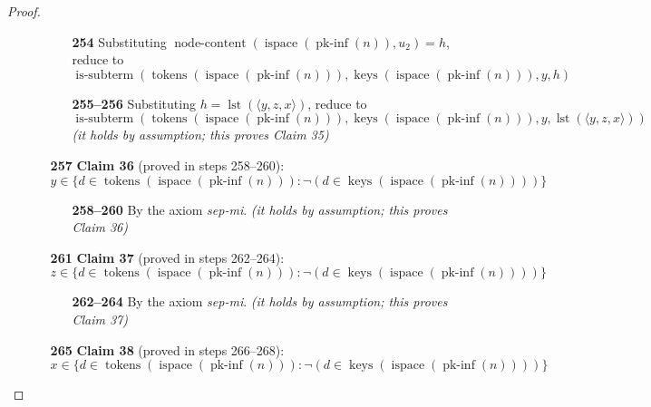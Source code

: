 \documentclass[11pt]{article}
\theoremstyle{plain}
\begin{document}
\begin{proof}
\begin{itemize}[leftmargin=2.8em, itemsep=4pt, parsep=1pt]
\begin{itemize}[leftmargin=2.8em, itemsep=4pt, parsep=1pt]
  \begin{itemize}[leftmargin=2.8em, itemsep=4pt, parsep=1pt]
  \item[\textbf{254}] Substituting $\operatorname{node\text{-}content}(\operatorname{ispace}(\operatorname{pk\text{-}inf}(n)), u_{2}) = h$, reduce to
\begin{equation*}
\operatorname{is\text{-}subterm}(\operatorname{tokens}(\operatorname{ispace}(\operatorname{pk\text{-}inf}(n))), \operatorname{keys}(\operatorname{ispace}(\operatorname{pk\text{-}inf}(n))), y, h)
\end{equation*}

  \item[\textbf{255--256}] Substituting $h = \operatorname{lst}(\langle y, z, x \rangle)$, reduce to
\begin{equation*}
\operatorname{is\text{-}subterm}(\operatorname{tokens}(\operatorname{ispace}(\operatorname{pk\text{-}inf}(n))), \operatorname{keys}(\operatorname{ispace}(\operatorname{pk\text{-}inf}(n))), y, \operatorname{lst}(\langle y, z, x \rangle))
\end{equation*}
  \emph{(it holds by assumption; this proves Claim 35)}
  \end{itemize}
  \item[\textbf{257}] \textbf{Claim 36} (proved in steps 258--260):
\begin{equation*}
y \in \{d \in \operatorname{tokens}(\operatorname{ispace}(\operatorname{pk\text{-}inf}(n))) : \neg (d \in \operatorname{keys}(\operatorname{ispace}(\operatorname{pk\text{-}inf}(n))))\}
\end{equation*}

  \begin{itemize}[leftmargin=2.8em, itemsep=4pt, parsep=1pt]
  \item[\textbf{258--260}] By the axiom \emph{sep-mi}.  \emph{(it holds by assumption; this proves Claim 36)}
  \end{itemize}
  \item[\textbf{261}] \textbf{Claim 37} (proved in steps 262--264):
\begin{equation*}
z \in \{d \in \operatorname{tokens}(\operatorname{ispace}(\operatorname{pk\text{-}inf}(n))) : \neg (d \in \operatorname{keys}(\operatorname{ispace}(\operatorname{pk\text{-}inf}(n))))\}
\end{equation*}

  \begin{itemize}[leftmargin=2.8em, itemsep=4pt, parsep=1pt]
  \item[\textbf{262--264}] By the axiom \emph{sep-mi}.  \emph{(it holds by assumption; this proves Claim 37)}
  \end{itemize}
  \item[\textbf{265}] \textbf{Claim 38} (proved in steps 266--268):
\begin{equation*}
x \in \{d \in \operatorname{tokens}(\operatorname{ispace}(\operatorname{pk\text{-}inf}(n))) : \neg (d \in \operatorname{keys}(\operatorname{ispace}(\operatorname{pk\text{-}inf}(n))))\}
\end{equation*}


\end{itemize}
\end{itemize}
\end{proof}
\end{document}
